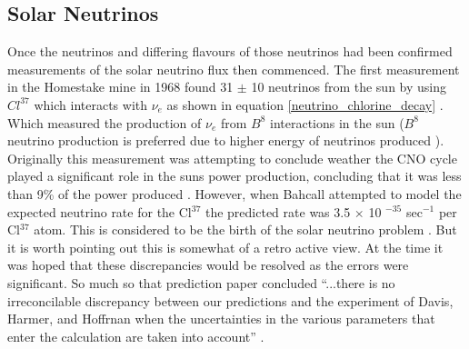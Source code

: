 \subsection{Solar Neutrinos}
Once the neutrinos and differing flavours of those neutrinos had been confirmed \cite{DanbyG1962PhysRevLett.9.36} measurements of the solar neutrino flux then commenced. The first measurement in the Homestake mine in 1968 found 31 $\pm$ 10 neutrinos from the sun \cite{davis1968homestake} by using $Cl^{37}$ which interacts with $\nu_e$ as shown in equation \ref{neutrino_chlorine_decay} \cite{Bellerive:2003rj}. Which measured the production of $\nu_e$ from $B^8$ interactions in the sun ($B^8$ neutrino production is preferred due to higher energy of neutrinos produced \cite{griffiths2008neutrinoOscillations}). Originally this measurement was attempting to conclude weather the CNO cycle played a significant role in the suns power production, concluding that it was less than 9\% of the power produced \cite{davis1968homestake}. However, when Bahcall attempted to model the expected neutrino rate for the Cl$^{37}$ the predicted rate was 3.5 $\times$ 10 $^{-35}$ sec$^{-1}$ per Cl$^{37}$ atom. This is considered to be the birth of the solar neutrino problem \cite{griffiths2008neutrinoOscillations}. But it is worth pointing out this is somewhat of a retro active view. At the time it was hoped that these discrepancies would be resolved as the errors were significant. So much so that prediction paper concluded ``...there is no irreconcilable discrepancy between our predictions and the experiment of Davis, Harmer, and Hoffrnan when the uncertainties in the various parameters that enter the calculation are taken into account'' \cite{bahcall1968present}.
